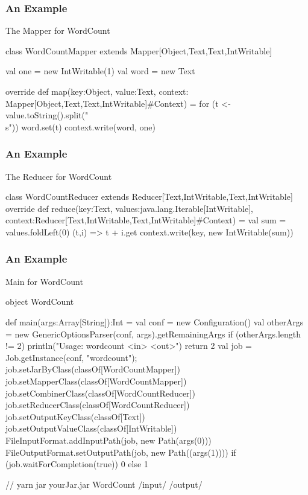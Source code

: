 \documentclass{beamer}
\newcommand{\beb}{\begin{exampleblock}}
\newcommand{\eeb}{\end{exampleblock}}
\begin{document}
\begin{frame}[fragile]
\frametitle{An Example}


\beb{The Mapper for WordCount}
{\scriptsize
\begin{code}
class WordCountMapper extends Mapper[Object,Text,Text,IntWritable] {
  val one = new IntWritable(1)
  val word = new Text
  
  override
  def map(key:Object, value:Text, context:
        Mapper[Object,Text,Text,IntWritable]#Context) = {
    for (t <-  value.toString().split("\\s")) {
      word.set(t)
      context.write(word, one)
    }
  }
}
\end{code}
}
\eeb

\end{frame}

\begin{frame}[fragile]
\frametitle{An Example}


\beb{The Reducer for WordCount}
{\scriptsize
\begin{code}
class WordCountReducer extends Reducer[Text,IntWritable,Text,IntWritable] {
  override
  def reduce(key:Text, values:java.lang.Iterable[IntWritable], 
        context:Reducer[Text,IntWritable,Text,IntWritable]#Context) = {
    val sum = values.foldLeft(0) { (t,i) => t + i.get }
    context.write(key, new IntWritable(sum))
  }
}\end{code}
}
\eeb

\end{frame}


\begin{frame}[fragile]
\frametitle{An Example}


\beb{Main for WordCount}
{\scriptsize
\begin{code}
object WordCount {

  def main(args:Array[String]):Int = {
    val conf = new Configuration()
    val otherArgs = new GenericOptionsParser(conf, args).getRemainingArgs
    if (otherArgs.length != 2) {
      println("Usage: wordcount <in> <out>")
      return 2
    }
    val job = Job.getInstance(conf, "wordcount");
    job.setJarByClass(classOf[WordCountMapper])
    job.setMapperClass(classOf[WordCountMapper])
    job.setCombinerClass(classOf[WordCountReducer])
    job.setReducerClass(classOf[WordCountReducer])
    job.setOutputKeyClass(classOf[Text])
    job.setOutputValueClass(classOf[IntWritable])
    FileInputFormat.addInputPath(job, new Path(args(0)))
    FileOutputFormat.setOutputPath(job, new Path((args(1))))
    if (job.waitForCompletion(true)) 0 else 1
  }
}
// yarn jar yourJar.jar WordCount /input/ /output/
\end{code}
}
\eeb

\end{frame}
\end{document}
